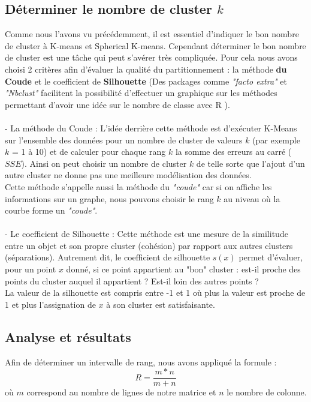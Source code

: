 \documentclass[runningheads]{llncs}
\begin{document}
\subsection{Déterminer le nombre de cluster $k$}

Comme nous l'avons vu précédemment, il est essentiel d'indiquer le bon nombre de cluster à K-means et Spherical K-means. Cependant déterminer le bon nombre de cluster est une tâche qui peut s'avérer très compliquée. 
Pour cela nous avons choisi 2 critères afin d'évaluer la qualité du partitionnement : la méthode \textbf{du Coude} et le coefficient de \textbf{Silhouette} (Des packages comme \textit{"facto extra"} et \textit{"Nbclust"} facilitent la possibilité d'effectuer un graphique sur les méthodes permettant d'avoir une idée sur le nombre de classe avec R \cite{rproject}).
\\ \\
- La méthode du Coude : L'idée derrière cette méthode est d'exécuter K-Means sur l'ensemble des données pour un nombre de cluster de valeurs $k$ (par exemple $k$ = 1 à 10) et de calculer pour chaque rang $k$ la somme des erreurs au carré ($SSE$). Ainsi on peut choisir un nombre de cluster $k$ de telle sorte que l'ajout d'un autre cluster ne donne pas une meilleure modélisation des données. \\
Cette méthode s'appelle aussi la méthode du \textit{"coude"} car si on affiche les informations sur un graphe, nous pouvons choisir le rang $k$ au niveau où la courbe forme un \textit{"coude"}. \\ \\
- Le coefficient de Silhouette : Cette méthode est une mesure de la similitude entre un objet et son propre cluster (cohésion) par rapport aux autres clusters (séparations). Autrement dit, le coefficient de silhouette $s(x)$ permet d'évaluer, pour un point $x$ donné, si ce point appartient au "bon" cluster : est-il proche des points du cluster auquel il appartient ? Est-il loin des autres points ? \\ 
La valeur de la silhouette est compris entre -1 et 1 où plus la valeur est proche de 1 et plus l'assignation de $x$ à son cluster est satisfaisante.
\\

\subsection{Analyse et résultats}

Afin de déterminer un intervalle de rang, nous avons appliqué la formule : $$R = \frac{m*n}{m+n}$$ où $m$ correspond au nombre de lignes de notre matrice et $n$ le nombre de colonne. 
\end{document}
